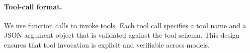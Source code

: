 \paragraph{Tool-call format.}
We use function calls to invoke tools.
Each tool call specifies a tool name and a JSON argument object that is validated against the tool schema.
This design ensures that tool invocation is explicit and verifiable across models.%




